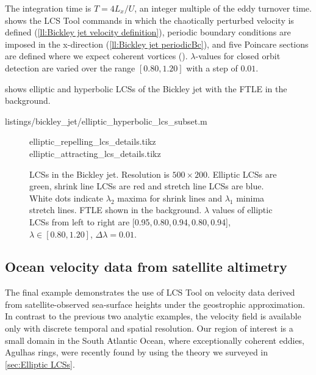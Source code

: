 \documentclass[5p]{elsarticle}
\newlength\figurewidth
\begin{document}
The integration time is $T = 4L_x/U$, an integer multiple of the eddy turnover time.
 shows the LCS Tool commands in which the chaotically perturbed velocity is defined (\cref{ll:Bickley jet velocity definition}), periodic boundary conditions are imposed in the x-direction (\cref{ll:Bickley jet periodicBc}), and five Poincare sections are defined where we expect coherent vortices ().
$\lambda$-values for closed orbit detection are varied over the range $[0.80,1.20]$ with a step of $0.01$.

 shows elliptic and hyperbolic LCSs of the Bickley jet with the FTLE in the background.


        {listings/bickley_jet/elliptic_hyperbolic_lcs_subset.m}

\begin{figure}
\centering
\setlength{}
{elliptic_repelling_lcs_details.tikz}
{elliptic_attracting_lcs_details.tikz}
\caption{
LCSs in the Bickley jet.
Resolution is $500 \times 200$.
Elliptic LCSs are green, shrink line LCSs are red and stretch line LCSs are blue.
White dots indicate $\lambda_2$ maxima for shrink lines and $\lambda_1$ minima stretch lines.
FTLE shown in the background.
$\lambda$ values of elliptic LCSs from left to right are [0.95,\,0.80,\,0.94,\,0.80,\,0.94], $\lambda \in [0.80,1.20]$, $\Delta\lambda = 0.01$.
}
\label{f:Bickley jet LCS}
\end{figure}

\subsection{Ocean velocity data from satellite altimetry}
\label{sec:oceandataset}

The final example demonstrates the use of LCS Tool on velocity data derived from satellite-observed sea-surface heights under the geostrophic approximation. In contrast to the previous two analytic examples, the velocity field is available only with discrete temporal and spatial resolution. Our region of interest is a small domain in the South Atlantic Ocean, where exceptionally coherent eddies, Agulhas rings, were recently found by \citet{haller13:_coher_lagran,haller14:_adden_coher_lagran} using the theory we surveyed in \cref{sec:Elliptic LCSs}.
\end{document}
